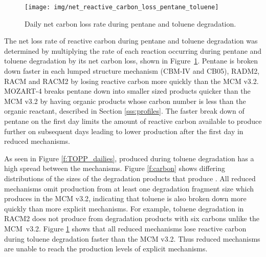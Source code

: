 %
\begin{figure}
    \centering
    \texttt{[image: img/net\_reactive\_carbon\_loss\_pentane\_toluene]}
    \vspace{0mm}
    \caption{Daily net carbon loss rate during pentane and toluene degradation.}
    \vspace{-4mm}
    \label{f:net_carbon_loss}
\end{figure}
%
The net loss rate of reactive carbon during pentane and toluene degradation was determined by multiplying the rate of each reaction occurring during pentane and toluene degradation by its net carbon loss, shown in \mbox{Figure \ref{f:net_carbon_loss}}.
Pentane is broken down faster in each lumped structure mechanism (CBM-IV and CB05), RADM2, RACM and RACM2 by losing reactive carbon more quickly than the MCM v3.2.
MOZART-4 breaks pentane down into smaller sized products quicker than the MCM v3.2 by having organic products whose carbon number is less than the organic reactant, described in Section \ref{sss:profiles}.
The faster break down of pentane on the first day limits the amount of reactive carbon available to produce further  on subsequent days leading to lower  production after the first day in reduced mechanisms.

As seen in Figure \ref{f:TOPP_dailies},  produced during toluene degradation has a high spread between the mechanisms.
Figure \ref{f:carbon} shows differing distributions of the sizes of the degradation products that produce .
All reduced mechanisms omit  production from at least one degradation fragment size which produces  in the MCM v3.2, indicating that toluene is also broken down more quickly than more explicit mechanisms.
For example, toluene degradation in RACM2 does not produce  from degradation products with six carbons unlike the \mbox{MCM v3.2}.  
Figure \ref{f:net_carbon_loss} shows that all reduced mechanisms lose reactive carbon during toluene degradation faster than the MCM v3.2.
Thus reduced mechanisms are unable to reach the  production levels of explicit mechanisms.

